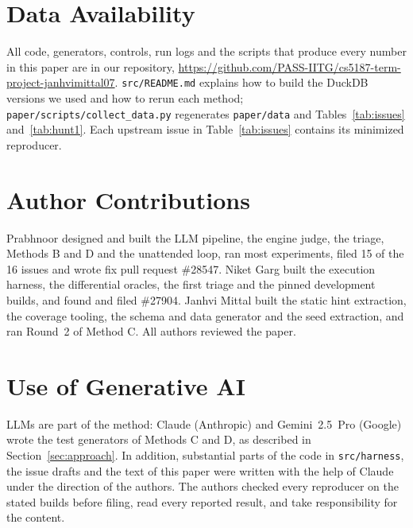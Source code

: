 \section*{Data Availability}
\label{sec:data}

All code, generators, controls, run logs and the scripts that produce every number in this paper are in our repository,
\url{https://github.com/PASS-IITG/cs5187-term-project-janhvimittal07}. \texttt{src/README.md} explains how to build the
DuckDB versions we used and how to rerun each method; \texttt{paper/scripts/collect\_data.py} regenerates
\texttt{paper/data} and Tables~\ref{tab:issues} and~\ref{tab:hunt1}. Each upstream issue in Table~\ref{tab:issues}
contains its minimized reproducer.

\section*{Author Contributions}
Prabhnoor designed and built the LLM pipeline, the engine judge, the triage, Methods B and D and the unattended
loop, ran most experiments, filed 15 of the 16 issues and wrote fix pull request \#28547. Niket Garg built the execution
harness, the differential oracles, the first triage and the pinned development builds, and found and filed \#27904.
Janhvi Mittal built the static hint extraction, the coverage tooling, the schema and data generator and the seed
extraction, and ran Round~2 of Method C. All authors reviewed the paper.

\section*{Use of Generative AI}
LLMs are part of the method: Claude (Anthropic) and Gemini~2.5~Pro (Google) wrote the test generators of Methods C and
D, as described in Section~\ref{sec:approach}. In addition, substantial parts of the code in \texttt{src/harness}, the
issue drafts and the text of this paper were written with the help of Claude under the direction of the authors. The
authors checked every reproducer on the stated builds before filing, read every reported result, and take
responsibility for the content.
